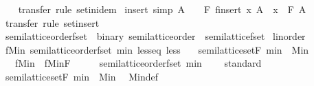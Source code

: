 \begin{isabellebody}
%
\isadelimproof
\ \ %
\endisadelimproof
%
\isatagproof
{}\isamarkupfalse%
\ transfer\ {\isacharparenleft}rule\ set{\isachardot}in{\isacharunderscore}idem{\isacharparenright}%
\endisatagproof
{\isafoldproof}%
%
\isadelimproof
\isanewline
%
\endisadelimproof
\isanewline
{}\isamarkupfalse%
\ insert\ {\isacharbrackleft}simp{\isacharbrackright}{\isacharcolon}\ {\isachardoublequoteopen}A\ {\isasymnoteq}\ {\isacharbraceleft}{\isacharbar}{\isacharbar}{\isacharbraceright}\ {\isasymLongrightarrow}\ F\ {\isacharparenleft}finsert\ x\ A{\isacharparenright}\ {\isacharequal}\ x\ \isactrlbold {\isacharasterisk}\ F\ A{\isachardoublequoteclose}\isanewline
%
\isadelimproof
\ \ %
\endisadelimproof
%
\isatagproof
{}\isamarkupfalse%
\ transfer\ {\isacharparenleft}rule\ set{\isachardot}insert{\isacharparenright}%
\endisatagproof
{\isafoldproof}%
%
\isadelimproof
\isanewline
%
\endisadelimproof
\isanewline
{}\isamarkupfalse%
\isanewline
\isanewline
{}\isamarkupfalse%
\ semilattice{\isacharunderscore}order{\isacharunderscore}fset\ {\isacharequal}\ binary{\isacharquery}{\isacharcolon}\ semilattice{\isacharunderscore}order\ {\isacharplus}\ semilattice{\isacharunderscore}fset\isanewline
{}\isanewline
\isanewline
{}\isamarkupfalse%
\isanewline
\isanewline
\isanewline
{}\isamarkupfalse%
\ linorder\ \isanewline
\isanewline
{}\isamarkupfalse%
\ fMin{\isacharcolon}\ semilattice{\isacharunderscore}order{\isacharunderscore}fset\ min\ less{\isacharunderscore}eq\ less\isanewline
\ \ \ {\isachardoublequoteopen}semilattice{\isacharunderscore}set{\isachardot}F\ min\ {\isacharequal}\ Min{\isachardoublequoteclose}\isanewline
\ \ \ fMin\ {\isacharequal}\ fMin{\isachardot}F\isanewline
%
\isadelimproof
%
\endisadelimproof
%
\isatagproof
{}\isamarkupfalse%
\ {\isacharminus}\isanewline
\ \ \isamarkupfalse%
\ {\isachardoublequoteopen}semilattice{\isacharunderscore}order{\isacharunderscore}fset\ min\ {\isacharparenleft}{\isasymle}{\isacharparenright}\ {\isacharparenleft}{\isacharless}{\isacharparenright}{\isachardoublequoteclose}\ \isamarkupfalse%
\ standard\isanewline
\isanewline
\ \ \isamarkupfalse%
\ {\isachardoublequoteopen}semilattice{\isacharunderscore}set{\isachardot}F\ min\ {\isacharequal}\ Min{\isachardoublequoteclose}\ \isamarkupfalse%
\ Min{\isacharunderscore}def\ \isacommand{{\isachardot}{\isachardot}}\isamarkupfalse%

\end{isabellebody}
